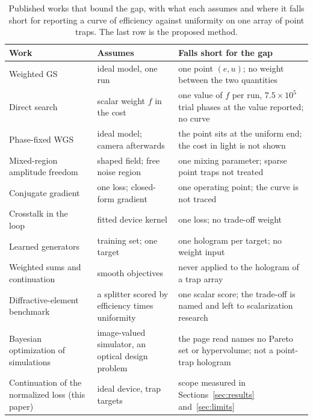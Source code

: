 \begin{table}[t]
\centering\small
\caption{Published works that bound the gap, with what each assumes and where it falls short for reporting a curve of efficiency against uniformity on one array of point traps. The last row is the proposed method.}
\label{tab:related}
\begin{tabular}{@{}p{4.2cm} p{4.3cm} p{5.6cm}@{}}
\toprule
Work & Assumes & Falls short for the gap\\
\midrule
Weighted GS~\cite{dileonardo} & ideal model, one run & one point $(e,u)$; no weight between the two quantities\\
Direct search~\cite{polin} & scalar weight $f$ in the cost & one value of $f$ per run, $7.5\times10^{5}$ trial phases at the value reported; no curve\\
Phase-fixed WGS~\cite{kim2019} & ideal model; camera afterwards & the point sits at the uniform end; the cost in light is not shown\\
Mixed-region amplitude freedom~\cite{pasienski} & shaped field; free noise region & one mixing parameter; sparse point traps not treated\\
Conjugate gradient~\cite{harte,bowman} & one loss; closed-form gradient & one operating point; the curve is not traced\\
Crosstalk in the loop~\cite{schroff,persson} & fitted device kernel & one loss; no trade-off weight\\
Learned generators~\cite{peng,eybposh,shi} & training set; one target & one hologram per target; no weight input\\
Weighted sums and continuation~\cite{miettinen,das1998,allgower} & smooth objectives & never applied to the hologram of a trap array\\
Diffractive-element benchmark~\cite{invrsgym} & a splitter scored by efficiency times uniformity & one scalar score; the trade-off is named and left to scalarization research\\
Bayesian optimization of simulations~\cite{maddox} & image-valued simulator, an optical design problem & the page read names no Pareto set or hypervolume; not a point-trap hologram\\
Continuation of the normalized loss (this paper) & ideal device, trap targets & scope measured in Sections~\ref{sec:results} and~\ref{sec:limits}\\
\bottomrule
\end{tabular}
\end{table}
